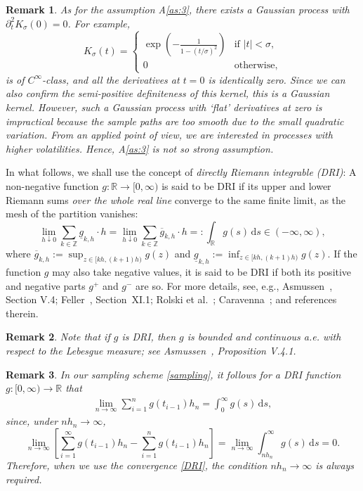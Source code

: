\documentclass[a4paper,10pt,twoside]{article}
\newtheorem{remark}{Remark}[section]
\numberwithin{equation}{section}
\def\R{\mathbb{R}}
\def\l{\left}
\def\r{\right}
\def\s{\sigma}
\def\p{\partial}
\def\ol#1{\overline{#1}}
\def\df{\mathrm{d}}
\begin{document}
\begin{remark}
As for the assumption A\ref{as:3}, there exists a Gaussian process with $\p_t^2 K_\s(0) = 0$. For example, 
\[
K_\s(t) = 
\begin{cases}
\exp\l(-\frac{1}{1 - \l(t/\s\r)^2}\r) & \text{if } |t| < \s, \\
0 & \text{otherwise}, 
\end{cases}
\]
is of $C^\infty$-class, and all the derivatives at $t=0$ is identically zero. Since we can also confirm the semi-positive definiteness of this kernel, 
this is a Gaussian kernel.
However, such a Gaussian process with `flat' derivatives at zero is  impractical because the sample paths are too smooth due to the small quadratic variation. From an applied point of view, we are interested in processes with higher volatilities. Hence, A\ref{as:3} is not so strong assumption. 
\end{remark}


In what follows, we shall use the concept of \emph{directly Riemann integrable (DRI)}: A non-negative function $g : \mathbb{R} \to [0, \infty)$ is said to be DRI if its upper and lower Riemann sums \emph{over the whole real line} converge to the same finite limit, as the mesh of the partition vanishes: 
\[
\lim_{h \downarrow 0} \sum_{k \in \mathbb{Z}}  \underline{g}_{k,h} \cdot h=\lim_{h \downarrow 0} \sum_{k \in \mathbb{Z}}  \ol{g}_{k,h}\cdot h =:\int_\R g(s)\,\df s \in (-\infty,\infty), 
\]
where $\ol{g}_{k,h}:=\sup_{z \in [kh, (k+1)h)} g(z)$ and $\underline{g}_{k,h} := \inf_{z \in [kh, (k+1)h)} g(z)$. 
If the function $g$ may also take negative values, it is said to be DRI if both its positive and negative parts $g^+$ and $g^-$ are so. For more details, see, e.g., Asmussen~\cite{a03}, Section V.4; Feller~\cite{f71}, Section~XI.1; Rolski et al.~\cite{retal99}; Caravenna~\cite{c12}; and references therein. 

\begin{remark}\label{rem:dri-cont}
Note that if $g$ is DRI, then $g$ is bounded and continuous a.e. with respect to the Lebesgue measure; see Asmussen~\cite{a03}, Proposition V.4.1. 
\end{remark}

\begin{remark}\label{rem:DRI}
In our sampling scheme \eqref{sampling}, it follows for a DRI function $g:[0,\infty)\to \R$ that 
\begin{align}
\lim_{n\to \infty}  \sum_{i=1}^n g(t_{i-1})h_n = \int_0^\infty g(s)\,\df s, \label{DRI}
\end{align}
since, under $nh_n\to \infty$, 
\[
\lim_{n\to \infty} \l[\sum_{i=1}^\infty g(t_{i-1})h_n  - \sum_{i=1}^n g(t_{i-1})h_n\r] = \lim_{n\to \infty} \int_{nh_n}^\infty g(s)\,\df s = 0. 
\]
Therefore, when we use the convergence \eqref{DRI}, the condition $nh_n\to \infty$ is always required. 

\end{remark}
\end{document}
